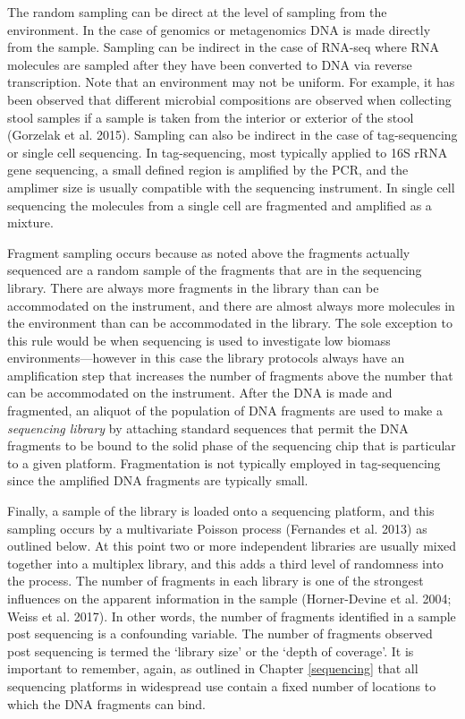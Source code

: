 \documentclass[onecolumn]{article}
\begin{document}
The random sampling can be direct at the level of sampling from the environment. In the case of genomics or metagenomics DNA is made directly from the sample. Sampling can be indirect in the case of RNA-seq where RNA molecules are sampled after they have been converted to DNA via reverse transcription. Note that an environment may not be uniform. For example, it has been observed that different microbial compositions are observed when collecting stool samples if a sample is taken from the interior or exterior of the stool (Gorzelak et al. 2015). Sampling can also be indirect in the case of tag-sequencing or single cell sequencing. In tag-sequencing, most typically applied to 16S rRNA gene sequencing, a small defined region is amplified by the PCR, and the amplimer size is usually compatible with the sequencing instrument. In single cell sequencing the molecules from a single cell are fragmented and amplified as a mixture.

Fragment sampling occurs because as noted above the fragments actually sequenced are a random sample of the fragments that are in the sequencing library. There are always more fragments in the library than can be accommodated on the instrument, and there are almost always more molecules in the environment than can be accommodated in the library. The sole exception to this rule would be when sequencing is used to investigate low biomass environments---however in this case the library protocols always have an amplification step that increases the number of fragments above the number that can be accommodated on the instrument. After the DNA is made and fragmented, an aliquot of the population of DNA fragments are used to make a \emph{sequencing library} by attaching standard sequences that permit the DNA fragments to be bound to the solid phase of the sequencing chip that is particular to a given platform. Fragmentation is not typically employed in tag-sequencing since the amplified DNA fragments are typically small.

Finally, a sample of the library is loaded onto a sequencing platform, and this sampling occurs by a multivariate Poisson process (Fernandes et al. 2013) as outlined below. At this point two or more independent libraries are usually mixed together into a multiplex library, and this adds a third level of randomness into the process. The number of fragments in each library is one of the strongest influences on the apparent information in the sample (Horner-Devine et al. 2004; Weiss et al. 2017). In other words, the number of fragments identified in a sample post sequencing is a confounding variable. The number of fragments observed post sequencing is termed the `library size' or the `depth of coverage'. It is important to remember, again, as outlined in Chapter \ref{sequencing} that all sequencing platforms in widespread use contain a fixed number of locations to which the DNA fragments can bind.
\end{document}

